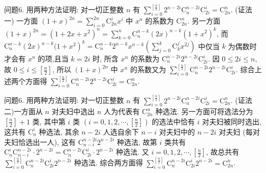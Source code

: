 问题6. 用两种方法证明: 对一切正整数 $n$ 有 $\sum_{i=0}^{\left[\frac{n}{2}\right]} 2^{n-2 i} \mathrm{C}_n^{n-2 i} \mathrm{C}_{2 i}^i=\mathrm{C}_{2 n}^n$.
(证法一) 一方面 $(1+x)^{2 n}=\sum_{i=0}^{2 n} \mathrm{C}_{2 n}^i x^i$ 中 $x^n$ 的系数为 $\mathrm{C}_{2 n}^n$. 另一方面
$(1+x)^{2 n}=\left(1+2 x+x^2\right)^n=\sum_{k=0}^n \mathrm{C}_n^{n-k}(2 x)^{n-k}\left(1+x^2\right)^k$, 而 $\mathrm{C}_n^{n-k}(2 x)^{n-k}(1+ \left.x^2\right)^k=\mathrm{C}_n^{n-k} 2^{n-k} x^{n-k}\left(\sum_{j=0}^k \mathrm{C}_k^j x^{2 j}\right)$ 中仅当 $k$ 为偶数时才会有 $x^n$ 的项,且当 $k=2 i$ 时, 所含 $x^n$ 的系数为 $\mathrm{C}_n^{n-2 i} 2^{n-2 i} \mathrm{C}_{2 i}^i$. 因 $0 \leqslant 2 i \leqslant n$, 故 $0 \leqslant i \leqslant\left[\frac{n}{2}\right]$, 所以 $(1+x)^{2 n}$ 中 $x^n$ 的系数又为 $\sum_{i=0}^{\left[\frac{n}{2}\right]} \mathrm{C}_n^{n-2 i} 2^{n-2 i} \mathrm{C}_{2 i}^i$. 综合上述两个方面得 $\sum_{i=0}^{\left[\frac{n}{2}\right]} \mathrm{C}_n^{n-2 i} 2^{n-2 i} \mathrm{C}_{2 i}^i=\mathrm{C}_{2 n}^n$.



问题6. 用两种方法证明: 对一切正整数 $n$ 有 $\sum_{i=0}^{\left[\frac{n}{2}\right]} 2^{n-2 i} \mathrm{C}_n^{n-2 i} \mathrm{C}_{2 i}^i=\mathrm{C}_{2 n}^n$.
(证法二)一方面从 $n$ 对夫妇中选出 $n$ 人为代表有 $\mathrm{C}_{2 n}^n$ 种选法.
另一方面可将选法分为 $\left[\frac{n}{2}\right]+1$ 类, 其中第 $i$ 类 $\left(i=0,1,2, \cdots,\left[\frac{n}{2}\right]\right)$ 的选法中恰有 $i$ 对夫妇被同时选出, 这共有 $\mathrm{C}_n^i$ 种选法, 其余 $n-2 i$ 人选自余下 $n-i$ 对夫妇中的 $n-2 i$ 对夫妇 (每对夫妇恰选出一人), 这有 $\mathrm{C}_{n-i}^{n-2 i} 2^{n-2 i}$ 种选法, 故第 $i$ 类共有 $\mathrm{C}_n^i \mathrm{C}_{n-i}^{n-2 i} \cdot 2^{n-2 i}=\mathrm{C}_n^{n-2 i} \mathrm{C}_{2 i}^i \cdot 2^{n-2 i}$ 种选法.
又 $i=0,1,2, \cdots,\left[\frac{n}{2}\right]$, 故总共有 $\sum_{i=0}^{\left[\frac{n}{2}\right]} \mathrm{C}_n^{n-2 i} \mathrm{C}_{2 i}^i 2^{n-2 i}$ 种选法.
综合两方面得 $\sum_{i=0}^{\left[\frac{n}{2}\right]} \mathrm{C}_n^{n-2 i} \mathrm{C}_{2 i}^i 2^{n-2 i}=\mathrm{C}_{2 n}^n$.


